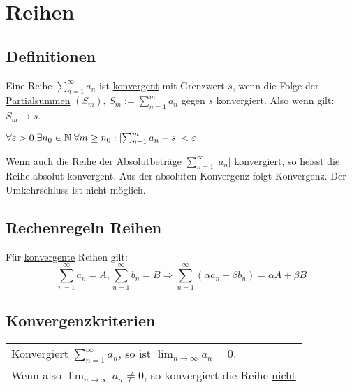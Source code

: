 
\section{Reihen}

\subsection{Definitionen}
Eine Reihe $\sum_{n = 1}^\infty a_n$ ist \underline{konvergent} mit Grenzwert
$s$, wenn die Folge der \underline{Partialsummen} $(S_m)$, $S_m :=
\sum_{n=1}^m a_n$ gegen $s$ konvergiert. Also wenn gilt: $S_m \to s$.

\begin{definition}
	$\forall \varepsilon > 0 \; \exists n_0 \in \mathbb{N} \; \forall m \geq n_0: \left|
	\sum_{n=1}^m a_n - s \right| < \varepsilon$
\end{definition}

\begin{definition}
	Wenn auch die Reihe der Absolutbeträge $\sum_{n=1}^\infty |a_n|$ konvergiert, so
	heisst die Reihe absolut konvergent. Aus der absoluten Konvergenz folgt
	Konvergenz. Der Umkehrschluss ist nicht möglich.
\end{definition}

\subsection{Rechenregeln Reihen}
Für \underline{konvergente} Reihen gilt:
\[
\sum_{n=1}^\infty a_n = A, \sum_{n=1}^\infty b_n = B \Rightarrow
\sum_{n=1}^\infty (\alpha a_n + \beta b_n) = \alpha A + \beta B
\]

\subsection{Konvergenzkriterien}
\begin{tabular}{|l|}
	\hline
	Konvergiert $\sum_{n=1}^\infty a_n$, so ist $\lim_{n \to \infty} a_n = 0$.\\
	Wenn also $\lim_{n \to \infty} a_n \neq 0$, so konvergiert die Reihe
	\underline{nicht}\\
	\hline
\end{tabular}


